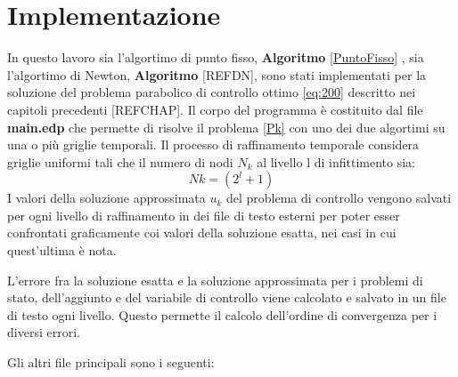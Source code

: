 \section{Implementazione}
In questo lavoro sia l'algortimo di punto fisso, \textbf{Algoritmo} \ref{PuntoFisso} , sia l'algortimo di Newton, \textbf{Algoritmo} [REFDN], sono stati implementati per la soluzione del problema parabolico di controllo ottimo \eqref{eq:200} descritto nei capitoli precedenti [REFCHAP].
Il corpo del programma è costituito dal file \textbf{main.edp} che permette di risolve il problema \ref{Pk} con uno dei due algortimi su una o più griglie temporali. Il processo di raffinamento temporale considera griglie uniformi tali che il numero di nodi $N_k$ al livello l di infittimento sia:
\begin{equation}
Nk = ( 2^l + 1 )
\label{Nk}
\end{equation}
I valori della soluzione approssimata $u_k$ del problema di controllo vengono salvati per ogni livello di raffinamento in dei file di testo esterni per poter esser confrontati graficamente coi valori della soluzione esatta, nei casi in cui quest'ultima è nota.
\par
L'errore fra la soluzione esatta e la soluzione approssimata per i problemi di stato, dell'aggiunto e del variabile di controllo viene calcolato e salvato in un file di testo ogni livello. Questo permette il calcolo dell'ordine di convergenza per i diversi errori.
\par
Gli altri file principali sono i seguenti:
